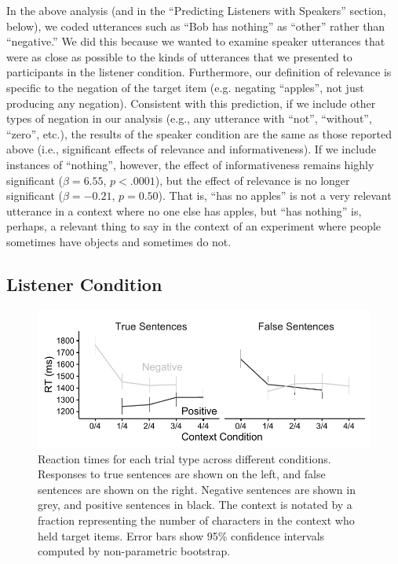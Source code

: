 \documentclass[man, noapacite]{apa2}
\begin{document}
In the above analysis (and in the ``Predicting Listeners with Speakers'' section, below), we coded utterances such as ``Bob has nothing'' as ``other'' rather than ``negative.'' We did this because we wanted to examine speaker utterances that were as close as possible to the kinds of utterances that we presented to participants in the listener condition. Furthermore, our definition of relevance is specific to the negation of the target item (e.g. negating ``apples'', not just producing any negation). Consistent with this prediction, if we include other types of negation in our analysis (e.g., any utterance with ``not'', ``without'', ``zero'', etc.), the results of the speaker condition are the same as those reported above (i.e., significant effects of relevance and informativeness). If we include instances of ``nothing'', however, the effect of informativeness remains highly significant ($\beta= 6.55$, $p< .0001$), but the effect of relevance is no longer significant ($\beta= -0.21$, $p = 0.50$). That is, ``has no apples'' is not a very relevant utterance in a context where no one else has apples, but ``has nothing'' is, perhaps, a relevant thing to say in the context of an experiment where people sometimes have objects and sometimes do not. 

\subsection{Listener Condition}

\begin{figure}[t]
\begin{center} 
\includegraphics[width=6in]{figures/rts_mod.pdf}
\caption{\label{fig:listenerrt} Reaction times for each trial type across different conditions. Responses to true sentences are shown on the left, and false sentences are shown on the right.  Negative sentences are shown in grey, and positive sentences in black.  The context is notated by a fraction representing the number of characters in the context who held target items. Error bars show 95\% confidence intervals computed by non-parametric bootstrap.}
\end{center} 
\end{figure}
\end{document}
